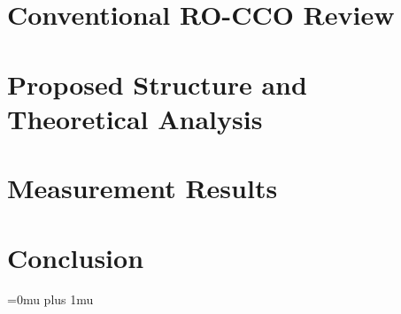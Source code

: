 \documentclass[journal,twoside]{IEEEtran}
\begin{document}
\section{Conventional RO-CCO Review}
\label{sec:conv}


\section{Proposed Structure and Theoretical Analysis}
\label{sec:prop}


\section{Measurement Results}
\label{sec:results}


% 
% 

\section{Conclusion}
\label{sec:conclusion}





% 

\Urlmuskip=0mu plus 1mu\relax



% 

\end{document}
